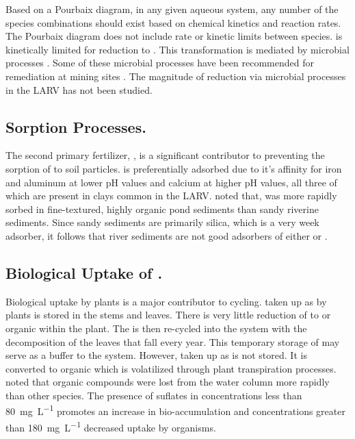 Based on a Pourbaix diagram, in any given aqueous system, any number of the species combinations should exist based on chemical kinetics and reaction rates.  The Pourbaix diagram does not include rate or kinetic limits between species.  \selenate is kinetically limited for reduction to \selenite.  This transformation is mediated by microbial processes \parencite{Lalvani2004}.  Some of these microbial processes have been recommended for \Se remediation at mining sites \parencite{MSE2001}.  The magnitude of \selenate reduction via microbial processes in the LARV has not been studied.

\subsection*{Sorption Processes.}
The second primary fertilizer, \phosphate, is a significant contributor to preventing the sorption of \selenite to soil particles.  \phosphate is preferentially adsorbed due to it's affinity for iron and aluminum at lower pH values and calcium at higher pH values, all three of which are present in clays common in the LARV.  \textcite{Besser1989} noted that, \Se was more rapidly sorbed in fine-textured, highly organic pond sediments than sandy riverine sediments.  Since sandy sediments are primarily silica, which is a very week adsorber, it follows that river sediments are not good adsorbers of either \phosphate or \selenite \parencite{Oram2008}.

\subsection*{Biological Uptake of \Se.}
Biological uptake by plants is a major contributor to \Se cycling.  \Se taken up as \selenate by plants is stored in the stems and leaves.  There is very little reduction of \selenate to \selenite or organic \Se within the plant.  The \selenate is then re-cycled into the system with the decomposition of the leaves that fall every year.  This temporary storage of \Se may serve as a buffer to the system.  However, \Se taken up as \selenite is not stored.  It is converted to organic \Se which is volatilized through plant transpiration processes.  \textcite{Besser1989} noted that organic \Se compounds were lost from the water column more rapidly than other \Se species.  The presence of suflates in concentrations less than \SI{80}{\milli\g\per\liter} promotes an increase in \Se bio-accumulation and concentrations greater than \SI{180}{\milli\g\per\liter} decreased \Se uptake by organisms.   

